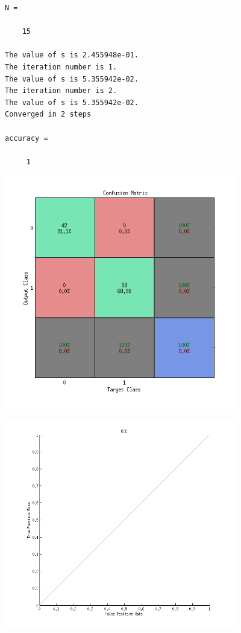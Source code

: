 \documentclass[12pt,letterpaper]{article}
\begin{document}
        \color{lightgray} \begin{verbatim}
N =

    15

The value of s is 2.455948e-01.
The iteration number is 1.
The value of s is 5.355942e-02.
The iteration number is 2.
The value of s is 5.355942e-02.
Converged in 2 steps

accuracy =

     1

\end{verbatim} \color{black}
    
\includegraphics [width=4in]{VersicolorVsVirginicaAndSetosa_ConfusionMatrix.png}

\includegraphics [width=4in]{VersicolorVsVirginicaAndSetosa_ROC.png}
\end{document}
